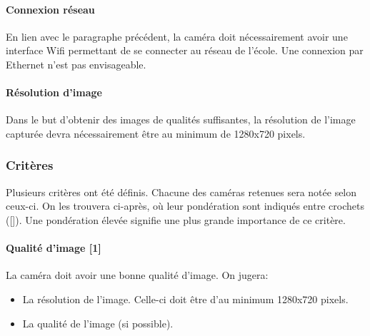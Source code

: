 \paragraph{Connexion réseau}
En lien avec le paragraphe précédent, la caméra doit nécessairement avoir une interface Wifi permettant de se connecter au réseau de l'école. Une connexion par Ethernet n'est pas envisageable.

\paragraph{Résolution d'image}
Dans le but d'obtenir des images de qualités suffisantes, la résolution de l'image capturée devra nécessairement être au minimum de 1280x720 pixels.

\subsubsection{Critères}
Plusieurs critères ont été définis. Chacune des caméras retenues sera notée selon ceux-ci. On les trouvera ci-après, où leur pondération sont indiqués entre crochets ([]). Une pondération élevée signifie une plus grande importance de ce critère.

\paragraph{Qualité d'image [1]}
La caméra doit avoir une bonne qualité d'image. On jugera:
\begin{itemize}
    \item La résolution de l'image. Celle-ci doit être d'au minimum 1280x720 pixels.
    \item La qualité de l'image (si possible).
\end{itemize}


